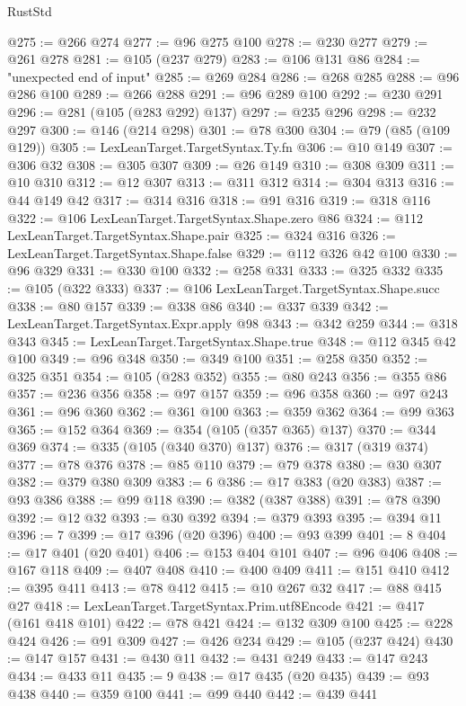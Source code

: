\begin{lexlean}{RustStd}
\begin{coremodule}
@275 := @266 @274
@277 := @96 @275 @100
@278 := @230 @277
@279 := @261 @278
@281 := @105 (@237 @279)
@283 := @106 @131 @86
@284 := "unexpected end of input"
@285 := @269 @284
@286 := @268 @285
@288 := @96 @286 @100
@289 := @266 @288
@291 := @96 @289 @100
@292 := @230 @291
@296 := @281 (@105 (@283 @292) @137)
@297 := @235 @296
@298 := @232 @297
@300 := @146 (@214 @298)
@301 := @78 @300
@304 := @79 (@85 (@109 @129))
@305 := LexLeanTarget.TargetSyntax.Ty.fn
@306 := @10 @149
@307 := @306 @32
@308 := @305 @307
@309 := @26 @149
@310 := @308 @309
@311 := @10 @310
@312 := @12 @307
@313 := @311 @312
@314 := @304 @313
@316 := @44 @149 @42
@317 := @314 @316
@318 := @91 @316
@319 := @318 @116
@322 := @106 LexLeanTarget.TargetSyntax.Shape.zero @86
@324 := @112 LexLeanTarget.TargetSyntax.Shape.pair
@325 := @324 @316
@326 := LexLeanTarget.TargetSyntax.Shape.false
@329 := @112 @326 @42 @100
@330 := @96 @329
@331 := @330 @100
@332 := @258 @331
@333 := @325 @332
@335 := @105 (@322 @333)
@337 := @106 LexLeanTarget.TargetSyntax.Shape.succ
@338 := @80 @157
@339 := @338 @86
@340 := @337 @339
@342 := LexLeanTarget.TargetSyntax.Expr.apply @98
@343 := @342 @259
@344 := @318 @343
@345 := LexLeanTarget.TargetSyntax.Shape.true
@348 := @112 @345 @42 @100
@349 := @96 @348
@350 := @349 @100
@351 := @258 @350
@352 := @325 @351
@354 := @105 (@283 @352)
@355 := @80 @243
@356 := @355 @86
@357 := @236 @356
@358 := @97 @157
@359 := @96 @358
@360 := @97 @243
@361 := @96 @360
@362 := @361 @100
@363 := @359 @362
@364 := @99 @363
@365 := @152 @364
@369 := @354 (@105 (@357 @365) @137)
@370 := @344 @369
@374 := @335 (@105 (@340 @370) @137)
@376 := @317 (@319 @374)
@377 := @78 @376
@378 := @85 @110
@379 := @79 @378
@380 := @30 @307
@382 := @379 @380 @309
@383 := 6
@386 := @17 @383 (@20 @383)
@387 := @93 @386
@388 := @99 @118
@390 := @382 (@387 @388)
@391 := @78 @390
@392 := @12 @32
@393 := @30 @392
@394 := @379 @393
@395 := @394 @11
@396 := 7
@399 := @17 @396 (@20 @396)
@400 := @93 @399
@401 := 8
@404 := @17 @401 (@20 @401)
@406 := @153 @404 @101
@407 := @96 @406
@408 := @167 @118
@409 := @407 @408
@410 := @400 @409
@411 := @151 @410
@412 := @395 @411
@413 := @78 @412
@415 := @10 @267 @32
@417 := @88 @415 @27
@418 := LexLeanTarget.TargetSyntax.Prim.utf8Encode
@421 := @417 (@161 @418 @101)
@422 := @78 @421
@424 := @132 @309 @100
@425 := @228 @424
@426 := @91 @309
@427 := @426 @234
@429 := @105 (@237 @424)
@430 := @147 @157
@431 := @430 @11
@432 := @431 @249
@433 := @147 @243
@434 := @433 @11
@435 := 9
@438 := @17 @435 (@20 @435)
@439 := @93 @438
@440 := @359 @100
@441 := @99 @440
@442 := @439 @441

\end{coremodule}
\end{lexlean}
